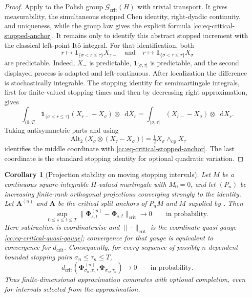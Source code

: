 \documentclass[10pt,reqno]{amsart}
\theoremstyle{plain}
\newtheorem{corollary}[theorem]{Corollary}
\theoremstyle{definition}
\theoremstyle{remark}
\begin{document}
\begin{proof}
Apply  to the Polish group
\(\mathscr G_{\mathrm{crit}}(H)\) with trivial transport.  It gives
measurability, the simultaneous stopped Chen identity, right-dyadic
continuity, and uniqueness, while the group law gives the explicit formula
\eqref{cc:eq-critical-stopped-anchor}.  It remains only to identify this
abstract stopped increment with the classical left-point It\^o integral.
For that identification, both
\[
 r\longmapsto{\mathbf 1}_{\{\sigma<r\leq\tau\}}X_{r-}
 \quad\text{and}\quad
 r\longmapsto{\mathbf 1}_{\{\sigma<r\leq\tau\}}X_\sigma
\]
are predictable.  Indeed, \(X_-\) is predictable,
\({\mathbf 1}_{(\sigma,\tau]}\) is predictable, and the second displayed
process is adapted and left-continuous.  After localization the difference
is stochastically integrable.  The stopping identity for semimartingale
integrals, first for finite-valued stopping times and then by decreasing
right approximation, gives
\[
 \int_{(0,T]}{\mathbf 1}_{\{\sigma<r\leq\tau\}}
 (X_{r-}-X_\sigma)\otimes\mathop{}\!\mathrm dX_r
 =
 \int_{(\sigma,\tau]}(X_{r-}-X_\sigma)\otimes
 \mathop{}\!\mathrm dX_r.
\]
Taking antisymmetric parts and using
\[
 \operatorname{Alt}_2\bigl(
 X_\sigma\otimes(X_\tau-X_\sigma)\bigr)
 =\tfrac12X_\sigma\wedge_{\mathrm{op}}X_\tau
\]
identifies the middle coordinate with
\eqref{cc:eq-critical-stopped-anchor}.  The last coordinate is the standard
stopping identity for optional quadratic variation.
\end{proof}

\begin{corollary}[Projection stability on moving stopping intervals]
\label{cc:cor-critical-stopped-projection}
Let \(M\) be a continuous square-integrable \(H\)-valued martingale with
\(M_0=0\), and let
\((P_n)\) be increasing finite-rank orthogonal projections converging
strongly to the identity.  Let \(\mathbf A^{(n)}\) and \(\mathbf A\) be the
critical split anchors of \(P_nM\) and \(M\) supplied by
.  Then
\begin{equation}
 \sup_{0\leq s\leq t\leq T}
 \bigl\|\mathbf\Phi^{(n)}_{s,t}-\mathbf\Phi_{s,t}\bigr\|_{\mathrm{crit}}
 \longrightarrow0
 \qquad\text{in probability}.
 \label{cc:eq-critical-uniform-interval-projection}
\end{equation}
Here subtraction is coordinatewise and
\(\|\cdot\|_{\mathrm{crit}}\) is the coordinate quasi-gauge
\eqref{cc:eq-critical-quasi-gauge}; convergence for that gauge is
equivalent to convergence for \(d_{\mathrm{crit}}\).
Consequently, for every sequence of possibly \(n\)-dependent bounded
stopping pairs \(\sigma_n\leq\tau_n\leq T\),
\[
 d_{\mathrm{crit}}\!\left(
 \mathbf\Phi^{(n)}_{\sigma_n,\tau_n},
 \mathbf\Phi_{\sigma_n,\tau_n}
 \right)\longrightarrow0
 \qquad\text{in probability}.
\]
Thus finite-dimensional approximation commutes with optional completion,
even for intervals selected from the approximation.
\end{corollary}
\end{document}

